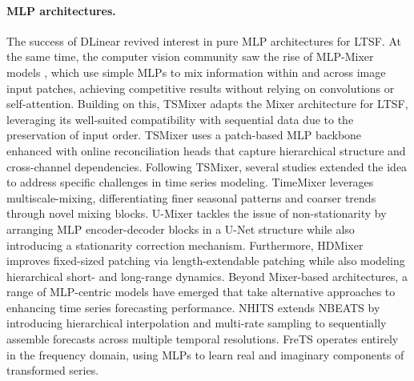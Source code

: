 \documentclass[a4paper,oneside,bibliography=totoc]{scrbook}
\begin{document}
% 
\paragraph{MLP architectures.}
The success of DLinear \cite{zeng_are_2023} revived interest in pure MLP architectures for LTSF. 
At the same time, the computer vision community saw the rise of MLP-Mixer models \cite{tolstikhin_mlp-mixer_2021, liu_pay_2021, touvron_resmlp_2023}, which use simple MLPs to mix information within and across image input patches, achieving competitive results without relying on convolutions or self-attention.
Building on this, TSMixer \cite{ekambaram_tsmixer_2023} adapts the Mixer architecture for LTSF, leveraging its well-suited compatibility with sequential data due to the preservation of input order. 
TSMixer uses a patch-based MLP backbone enhanced with online reconciliation heads that capture hierarchical structure and cross-channel dependencies. 
Following TSMixer, several studies extended the idea to address specific challenges in time series modeling. 
TimeMixer \cite{wang_timemixer_2023} leverages multiscale-mixing, differentiating finer seasonal patterns and coarser trends through novel mixing blocks. 
U-Mixer \cite{ma_u-mixer_2024} tackles the issue of non-stationarity by arranging MLP encoder-decoder blocks in a U-Net structure \cite{ronneberger_u-net_2015} while also introducing a stationarity correction mechanism. 
Furthermore, HDMixer \cite{huang_hdmixer_2024} improves fixed-sized patching via length-extendable patching while also modeling hierarchical short- and long-range dynamics.
Beyond Mixer-based architectures, a range of MLP-centric models have emerged that take alternative approaches to enhancing time series forecasting performance. 
NHITS \cite{challu_nhits_2023} extends NBEATS \cite{oreshkin_n-beats_2019} by introducing hierarchical interpolation and multi-rate sampling to sequentially assemble forecasts across multiple temporal resolutions. 
FreTS \cite{yi_frequency-domain_2023} operates entirely in the frequency domain, using MLPs to learn real and imaginary components of transformed series. 
\end{document}
